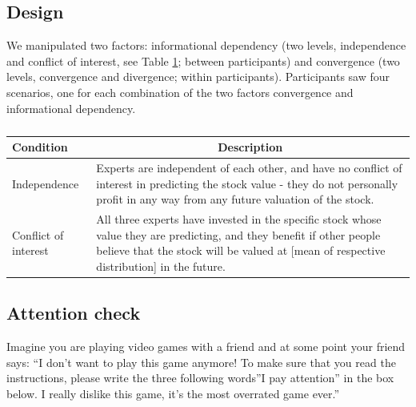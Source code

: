 \documentclass[
  doc,floatsintext]{apa6}
\begin{document}
\subsection{Design}\label{design-7}

\FloatBarrier

We manipulated two factors: informational dependency (two levels, independence and conflict of interest, see Table \ref{tab:conditions-exp3}; between participants) and convergence (two levels, convergence and divergence; within participants). Participants saw four scenarios, one for each combination of the two factors convergence and informational dependency.

\begin{table}[tbp]

\begin{center}
\begin{threeparttable}

\caption{\label{tab:conditions-exp3}}

\begin{tabular}{m{3cm}m{12cm}}
\toprule
Condition & \multicolumn{1}{c}{Description}\\
\midrule
Independence & Experts are independent of each other, and have no conflict of interest in predicting the stock value - they do not personally profit in any way from any future valuation of the stock.\\
Conflict of interest & All three experts have invested in the specific stock whose value they are predicting, and they benefit if other people believe that the stock will be valued at [mean of respective distribution] in the future.\\
\bottomrule
\end{tabular}

\end{threeparttable}
\end{center}

\end{table}

\subsection{Attention check}\label{attention-check-2}

Imagine you are playing video games with a friend and at some point your friend says: ``I don't want to play this game anymore! To make sure that you read the instructions, please write the three following words''I pay attention'' in the box below. I really dislike this game, it's the most overrated game ever.''
\end{document}
